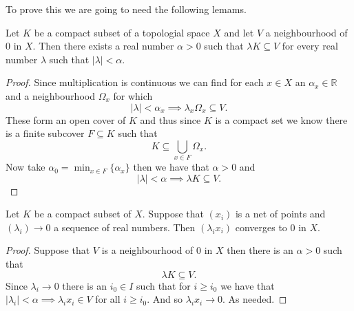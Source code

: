 To prove this we are going to need the following lemams. 
\begin{lemma}
  Let $K$ be a compact subset of a topologial space $X$ and let $V$ 
  a neighbourhood of 0 in $X$. Then there exists a real number $\alpha > 0$ 
  such that $\lambda K \subseteq V$ for every real number $\lambda$ such that
  $|\lambda| < \alpha$.
\end{lemma}
\begin{proof}
  Since multiplication is continuous we can find for each $x \in X$ an $\alpha_x 
  \in \mathbb{R}$  and a neighbourhood $\Omega_x$ for which
  \[
  |\lambda| < \alpha_x \implies \lambda_x \Omega_x \subseteq V
  .\] 
  These form an open cover of $K$ and thus since $K$ is a compact set we know
  there is a finite subcover $F \subseteq K$ such that
  \[
  K \subseteq \bigcup_{x \in F} \Omega_x
  .\] 
  Now take $\alpha_0 = \min_{x \in F} \{\alpha_x\} $ then we have that
  $\alpha > 0$ and
  \[
  |\lambda| < \alpha \implies \lambda K \subseteq V
  .\] 
\end{proof}

\begin{lemma}
  Let $K$ be a compact subset of $X$. Suppose that $(x_i)$ is a net of points
  and $(\lambda_i) \to 0$ a sequence of real numbers. Then $(\lambda_i x_i)$ 
  converges to 0 in $X$. 
\end{lemma}
\begin{proof}
  Suppose that $V$ is a neighbourhood of 0 in $X$ then there is an $\alpha
  > 0$ such that
  \[
    \lambda K \subseteq V \tag{For all $\lambda < \alpha$}
  .\] 
  Since $\lambda_i \to 0$ there is an $i_0 \in I$ such that for  $i \ge i_0$ we
  have that $|\lambda_i| < \alpha \implies \lambda_i x_i \in V$ for all $i \ge
  i_0$. And so $\lambda_i x_i \to 0$. As needed.
\end{proof}

